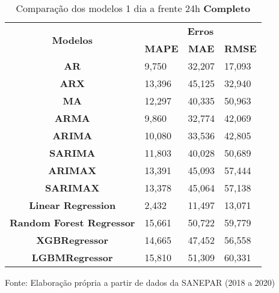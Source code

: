 \begin{table}[H]
	\centering
	\caption{Comparação dos modelos 1 dia a frente 24h \textbf{Completo} }\label{tb:1-24cm}
	\begin{tabular}{@{}clll@{}}
		\toprule
		\multirow{2}{*}{\textbf{Modelos}} & \multicolumn{3}{c}{\textbf{Erros}}                                                                       \\ \cmidrule(l){2-4} 
		& \multicolumn{1}{c}{\textbf{MAPE}} & \multicolumn{1}{c}{\textbf{MAE}} & \multicolumn{1}{c}{\textbf{RMSE}} \\ \hline
\textbf{AR}                       & 9,750                             & 32,207                           & 17,093                            \\
\textbf{ARX}                      & 13,396                            & 45,125                           & 32,940                            \\
\textbf{MA}                       & 12,297                            & 40,335                           & 50,963                            \\
\textbf{ARMA}                     & 9,860                             & 32,774                           & 42,069                            \\
\textbf{ARIMA}                    & 10,080                            & 33,536                           & 42,805                            \\
\textbf{SARIMA}                   & 11,803                            & 40,028                           & 50,689                            \\
\textbf{ARIMAX}                   & 13,391                            & 45,093                           & 57,444                            \\
\textbf{SARIMAX}                  & 13,378                            & 45,064                           & 57,138                            \\
\textbf{Linear Regression}        & 2,432                             & 11,497                           & 13,071                            \\
\textbf{Random Forest Regressor}  & 15,661                            & 50,722                           & 59,779                            \\
\textbf{XGBRegressor}             & 14,665                            & 47,452                           & 56,558                            \\
\textbf{LGBMRegressor}            & 15,810                            & 51,309                           & 60,331                            \\ \bottomrule
	\end{tabular}

Fonte: Elaboração própria a partir de dados da SANEPAR (2018 a 2020)
\end{table}


